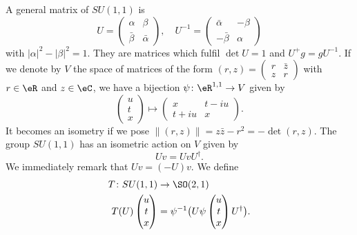 A general matrix of $SU(1,1)$ is
\[ 
  U=\begin{pmatrix}
\alpha&\beta\\\bar\beta&\bar\alpha
\end{pmatrix},
\quad
U^{-1}=\begin{pmatrix}
\bar\alpha&-\beta\\-\bar\beta&\alpha
\end{pmatrix}
\]
with $| \alpha |^2 - | \beta |^2=1$. They are matrices which fulfil $\det U=1$ and $U^+g=gU^{-1}$.  If we denote by $V$ the space of matrices of the form $(r,z)=\begin{pmatrix}
r&\bar z\\z&r
\end{pmatrix}$ with $r\in\eR$ and $z\in\eC$, we have a bijection $\psi\colon \eR^{1,1}\to V$ given by
\[ 
  \begin{pmatrix}
u\\t\\x
\end{pmatrix}\mapsto
\begin{pmatrix}
x&t-iu\\ t+iu&x
\end{pmatrix}.  
\]
It becomes an isometry if we pose $\| (r,z) \|=z\bar z-r^2=-\det(r,z)$. The group $SU(1,1)$ has an isometric action on $V$ given by
\[ 
  Uv=UvU^{\dag}.
\]
We immediately remark that $Uv=(-U)v$. We define
\begin{equation}
\begin{aligned}
 T\colon SU(1,1)&\to \SO(2,1) \\ 
T(U)\begin{pmatrix}
u\\t\\x
\end{pmatrix}&= \psi^{-1}\big( U\psi\begin{pmatrix}
u\\t\\x
\end{pmatrix}U^{\dag} \big). 
\end{aligned}
\end{equation}

